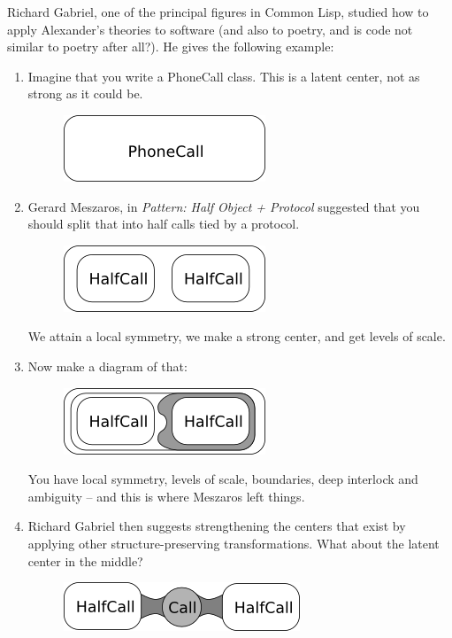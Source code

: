 Richard Gabriel, one of the principal figures in Common Lisp, studied how to
apply Alexander's theories to software (and also to poetry, and is code not
similar to poetry after all?). He gives the following example:
\begin{enumerate}
 \item Imagine that you write a PhoneCall class. This is a latent center, not as
strong as it could be.
   \begin{figure}[h!]
     \centering
     \includegraphics[scale=0.6,keepaspectratio=true]{./usability/federico1.png}
   \end{figure}
 \item Gerard Meszaros, in \textit{Pattern: Half Object + Protocol} suggested
that you should split that into half calls tied by a protocol.
   \begin{figure}[h!]
     \centering
     \includegraphics[scale=0.6,keepaspectratio=true]{./usability/federico2.png}
   \end{figure}
 We attain a local symmetry, we make a strong center, and get levels of scale.
 \item Now make a diagram of that:
   \begin{figure}[h!]
     \centering
     \includegraphics[scale=0.6,keepaspectratio=true]{./usability/federico3.png}
   \end{figure}
 You have local symmetry, levels of scale, boundaries, deep interlock and
ambiguity -- and this is where Meszaros left things.
 \item Richard Gabriel then suggests strengthening the centers that exist by
applying other structure-preserving transformations. What about the latent
center in the middle?
   \begin{figure}[h!]
     \centering
     \includegraphics[scale=0.6,keepaspectratio=true]{./usability/federico4.png}

\end{figure}
\end{enumerate}
